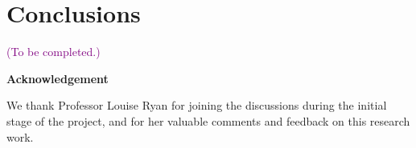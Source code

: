 \documentclass[11pt,a4paper,]{article}
\begin{document}
\hypertarget{sec-conclusion}{%
\section{Conclusions}\label{sec-conclusion}}

\textcolor{purple}{(To be completed.)} \newline

\textbf{\large{Acknowledgement}}

We thank Professor Louise Ryan for joining the discussions during the
initial stage of the project, and for her valuable comments and feedback
on this research work.

\printbibliography
\end{document}

